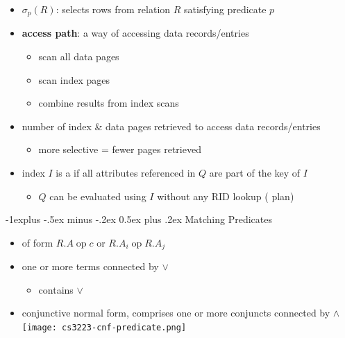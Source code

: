 \documentclass[9pt, landscape]{extarticle}
\makeatletter
\renewcommand{\subsection}{\@startsection{subsection}{2}{0mm}%
  {-1explus -.5ex minus -.2ex}%
  {0.5ex plus .2ex}%
{\normalfont\normalsize\bfseries}}
\makeatother
\begin{document}
\begin{multicols*}{4}
  \begin{itemize}
    \item $\sigma_p(R)$: selects rows from relation $R$ satisfying predicate $p$
    \item \textbf{access path}: a way of accessing data records/entries 
      \begin{itemize}
        \item {} scan all data pages
        \item {} scan index pages
        \item {} combine results from index scans 
      \end{itemize}
    \item {} number of index \& data pages retrieved to access data records/entries
      \begin{itemize}
        \item more selective = fewer pages retrieved
      \end{itemize}
    \item index $I$ is a  if all attributes referenced in $Q$ are part of the key of $I$ 
      \begin{itemize}
        \item $Q$ can be evaluated using $I$ without any RID lookup ( plan)
      \end{itemize}
  \end{itemize}

  \subsection{Matching Predicates}

  \begin{itemize}
    \item {} of form $R.A \;\mathrm{op}\; c$ or $R.A_i \;\mathrm{op}\; R.A_j$
    \item {} one or more terms connected by $\lor$
      \begin{itemize}
        \item {} contains $\lor$
      \end{itemize}
    \item conjunctive normal form,  comprises one or more conjuncts connected by $\land$
      \texttt{[image: cs3223-cnf-predicate.png]} 
  \end{itemize}


\end{multicols*}
\end{document}

